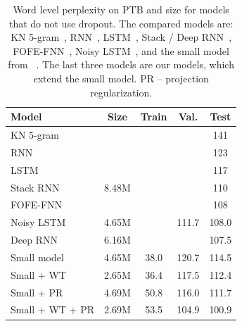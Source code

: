 \documentclass[11pt]{article}
\begin{document}
\begin{table}[t]


\begin{center}
\begin{small}
%

\begin{tabular}{l|cccc}
\hline
     Model  &   Size & Train     & Val.  & Test\\ \hline
KN 5-gram   &   &  &                       & 141             \\ 
RNN         &   &            &          & 123             \\ 
LSTM     &   &         &          & 117             \\ 
Stack RNN   &8.48M  &  &                       & 110             \\ 
FOFE-FNN    &   &   &                       & 108             \\ 
Noisy LSTM  &4.65M  &      &  111.7                & 108.0 \\ 
Deep RNN    &6.16M  &   &                 & 107.5             \\ 
Small model &4.65M  & 38.0 & 120.7                & 114.5          \\ 
\hline
Small  + WT &2.65M & 36.4&  117.5  &   112.4\\  
Small  + PR &4.69M   & 50.8 & 116.0   &  111.7  \\ 

Small  + WT + PR & 2.69M & 53.5 & 104.9   & 100.9  \\ \hline
\end{tabular}
\end{small}
\end{center}


\caption{\small Word level perplexity on PTB and size for models that do not use dropout. The compared models are: KN 5-gram~\protect\cite{MikolovKBCK11}, RNN~\protect\cite{MikolovKBCK11}, LSTM~\protect\cite{Graves13}, Stack / Deep RNN~\protect\cite{Pascanu13}, FOFE-FNN~\protect\cite{Zhang15}, Noisy LSTM~\protect\cite{gulcehre16}, and the small model from ~\protect\cite{zaremba14}. The last three models are our models, which extend the small model. PR -- projection regularization. }
\label{tab:lm-ptb-no-do}
\end{table}
\end{document}
